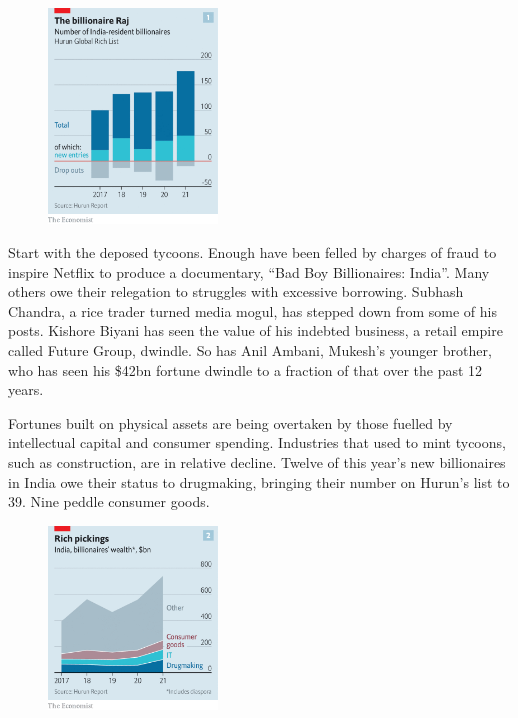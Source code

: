 \documentclass{article}
\begin{document}
\begin{figure}[h]
\centering
\includegraphics[width=0.4\textwidth]{images/20210327_wbc292.png}
\end{figure}


Start with the deposed tycoons. Enough have been felled by charges of fraud to inspire Netflix to produce a documentary, ``Bad Boy Billionaires: India''. Many others owe their relegation to struggles with excessive borrowing. Subhash Chandra, a rice trader turned media mogul, has stepped down from some of his posts. Kishore Biyani has seen the value of his indebted business, a retail empire called Future Group, dwindle. So has Anil Ambani, Mukesh's younger brother, who has seen his \$42bn fortune dwindle to a fraction of that over the past 12 years. 

Fortunes built on physical assets are being overtaken by those fuelled by intellectual capital and consumer spending. Industries that used to mint tycoons, such as construction, are in relative decline. Twelve of this year's new billionaires in India owe their status to drugmaking, bringing their number on Hurun's list to 39. Nine peddle consumer goods. 

\begin{figure}[h]
\centering
\includegraphics[width=0.4\textwidth]{images/20210327_wbc314.png}
\end{figure}
\end{document}
